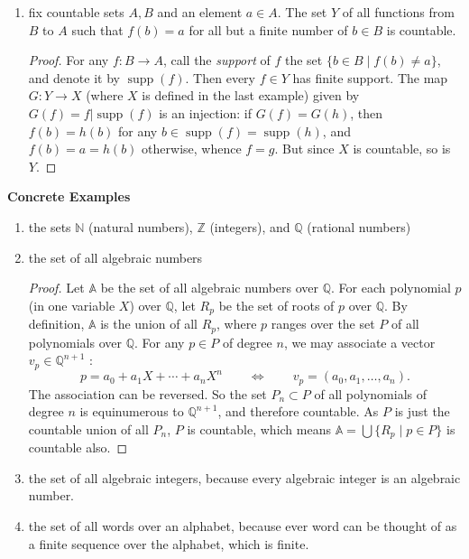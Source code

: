 \documentclass[12pt]{article}
\begin{document}
\begin{enumerate}
\begin{proof}
\end{proof}
\item fix countable sets $A,B$ and an element $a\in A$.  The set $Y$ of all functions from $B$ to $A$ such that $f(b)=a$ for all but a finite number of $b\in B$ is countable.
\begin{proof}  For any $f: B\to A$, call the \emph{support} of $f$ the set $\lbrace b \in B\mid f(b)\ne a\rbrace$, and denote it by $\operatorname{supp}(f)$.  Then every $f\in Y$ has finite support.  The map $G:Y\to X$ (where $X$ is defined in the last example) given by $G(f)=f|\operatorname{supp}(f)$ is an injection: if $G(f)=G(h)$, then $f(b)=h(b)$ for any $b\in \operatorname{supp}(f)=\operatorname{supp}(h)$, and $f(b)=a=h(b)$ otherwise, whence $f=g$.  But since $X$ is countable, so is $Y$.
\end{proof}
\end{enumerate}

\textbf{Concrete Examples}
\begin{enumerate}
\item the sets $\mathbb{N}$ (natural numbers), $\mathbb{Z}$ (integers), and $\mathbb{Q}$ (rational numbers)
\item the set of all algebraic numbers
\begin{proof}  Let $\mathbb{A}$ be the set of all algebraic numbers over $\mathbb{Q}$.  For each polynomial $p$ (in one variable $X$) over $\mathbb{Q}$, let $R_p$ be the set of roots of $p$ over $\mathbb{Q}$.  By definition, $\mathbb{A}$ is the union of all $R_p$, where $p$ ranges over the set $P$ of all polynomials over $\mathbb{Q}$.  For any $p \in P$ of degree $n$, we may associate a vector $v_p \in \mathbb{Q}^{n+1}$ : $$p=a_0 + a_1X + \cdots + a_n X^n \qquad \Longleftrightarrow \qquad v_p=(a_0,a_1,\ldots, a_n).$$  The association can be reversed.  So the set $P_n \subset P$ of all polynomials of degree $n$ is equinumerous to $\mathbb{Q}^{n+1}$, and therefore countable.  As $P$ is just the countable union of all $P_n$, $P$ is countable, which means $\mathbb{A} = \bigcup \lbrace R_p \mid p \in P\rbrace$ is countable also.
\end{proof}
\item the set of all algebraic integers, because every algebraic integer is an algebraic number.
\item the set of all words over an alphabet, because ever word can be thought of as a finite sequence over the alphabet, which is finite.
\end{enumerate}
\end{document}
